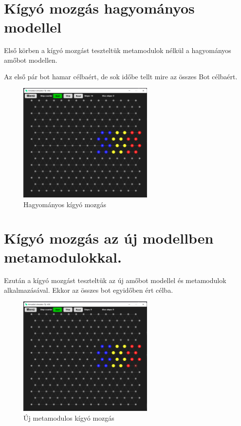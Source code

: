 \documentclass[	
  noindent
]{elteikthesis}[2024/04/26]
\begin{document}
  \section{Kígyó mozgás hagyományos modellel}
    Első körben a kígyó mozgást teszteltük metamodulok nélkül a hagyományos amőbot modellen.

    Az első pár bot hamar célbaért, de sok időbe tellt mire az összes Bot célbaért.

    \begin{figure}[H]
      \centering
      \includegraphics[width=0.6\textwidth]{images/mesurements/01_step_snake.png}
      \caption{Hagyományos kígyó mozgás}
      \label{fig:01_step_snake}
    \end{figure}

  \section{Kígyó mozgás az új modellben metamodulokkal.}
    Ezután a kígyó mozgást teszteltük az új amőbot modellel és metamodulok alkalmazásával. Ekkor az összes bot egyidőben ért célba.

    \begin{figure}[H]
      \centering
      \includegraphics[width=0.6\textwidth]{images/mesurements/02_blokk_snake.png}
      \caption{Új metamodulos kígyó mozgás}
      \label{fig:02_blokk_snake}
    \end{figure}
  
\end{document}
